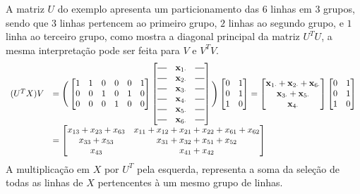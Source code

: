 \documentclass[
    12pt,                %
    oneside,            %
    a4paper,            %
    english,            %
    brazil                %
    ]{abntex2ppgsi}
\newcommand*{\horzbar}{\rule[.5ex]{2.5ex}{0.5pt}}
\begin{document}
A matriz $U$ do exemplo apresenta um particionamento das $6$ linhas em $3$ grupos, sendo que $3$ linhas pertencem ao primeiro grupo, $2$ linhas ao segundo grupo, e $1$ linha ao terceiro grupo, como mostra a diagonal principal da matriz $U^T U$, a mesma interpretação pode ser feita para $V$ e $V^T V$.
\[
\begin{array}{ll}
(U^T X) V & = \Bigg(\begin{bmatrix}
1 & 1 & 0 & 0 & 0 & 1 \\
0 & 0 & 1 & 0 & 1 & 0 \\
0 & 0 & 0 & 1 & 0 & 0
\end{bmatrix}
\begin{bmatrix}
\horzbar & \mathbf{x}_{1 \cdot} & \horzbar \\
\horzbar & \mathbf{x}_{2 \cdot} & \horzbar \\
\horzbar & \mathbf{x}_{3 \cdot} & \horzbar \\
\horzbar & \mathbf{x}_{4 \cdot} & \horzbar \\
\horzbar & \mathbf{x}_{5 \cdot} & \horzbar \\
\horzbar & \mathbf{x}_{6 \cdot} & \horzbar
\end{bmatrix}\Bigg)
\begin{bmatrix}
0 & 1 \\
0 & 1 \\
1 & 0
\end{bmatrix}
= \begin{bmatrix}
\mathbf{x}_{1 \cdot} + \mathbf{x}_{2 \cdot} + \mathbf{x}_{6 \cdot} \\
\mathbf{x}_{3 \cdot} + \mathbf{x}_{5 \cdot}                        \\
\mathbf{x}_{4 \cdot}
\end{bmatrix}
\begin{bmatrix}
0 & 1 \\
0 & 1 \\
1 & 0
\end{bmatrix} \\
& = \begin{bmatrix}
x_{13} + x_{23} + x_{63} & x_{11} + x_{12} + x_{21} + x_{22} + x_{61} + x_{62} \\
x_{33} + x_{53}          & x_{31} + x_{32} + x_{51} + x_{52}                   \\
x_{43}                   & x_{41} + x_{42}
\end{bmatrix}
\end{array}
\]
A multiplicação em $X$ por $U^T$ pela esquerda, representa a soma da seleção de todas as linhas de $X$ pertencentes à um mesmo grupo de linhas.
\end{document}
